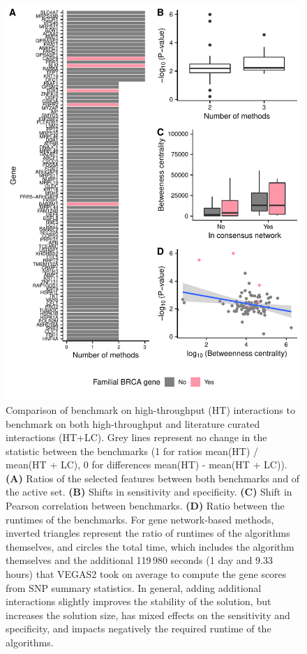 \documentclass[draft,twocolumn, 11pt]{article}
\begin{document}
\begin{figure}[htbp]
\centering
\includegraphics[width=.85\linewidth]{./figures/sfigure_8.pdf}
\caption{Comparison of benchmark on high-throughput (HT) interactions to benchmark on both high-throughput and literature curated interactions (HT+LC). Grey lines represent no change in the statistic between the benchmarks (1 for ratios mean(HT) / mean(HT + LC), 0 for differences mean(HT) - mean(HT + LC)). \textbf{(A)} Ratios of the selected features between both benchmarks and of the active set. \textbf{(B)} Shifts in sensitivity and specificity. \textbf{(C)} Shift in Pearson correlation between benchmarks. \textbf{(D)} Ratio between the runtimes of the benchmarks. For gene network-based methods, inverted triangles represent the ratio of runtimes of the algorithms themselves, and circles the total time, which includes the algorithm themselves and the additional 119\,980 seconds (1 day and 9.33 hours) that VEGAS2 took on average to compute the gene scores from SNP summary statistics. In general, adding additional interactions slightly improves the stability of the solution, but increases the solution size, has mixed effects on the sensitivity and specificity, and impacts negatively the required runtime of the algorithms.}
\label{sfig:lc_ht_comparison}
\end{figure}
\end{document}
